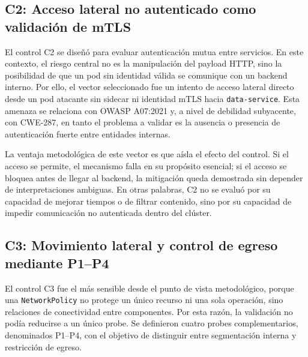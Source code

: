 \subsection{C2: Acceso lateral no autenticado como validación de mTLS}

El control C2 se diseñó para evaluar autenticación mutua entre servicios. En este contexto, el riesgo central no es la manipulación del payload HTTP, sino la posibilidad de que un pod sin identidad válida se comunique con un backend interno. Por ello, el vector seleccionado fue un intento de acceso lateral directo desde un pod atacante sin sidecar ni identidad mTLS hacia \texttt{data-service}. Esta amenaza se relaciona con OWASP A07:2021 y, a nivel de debilidad subyacente, con CWE-287, en tanto el problema a validar es la ausencia o presencia de autenticación fuerte entre entidades internas.

La ventaja metodológica de este vector es que aísla el efecto del control. Si el acceso se permite, el mecanismo falla en su propósito esencial; si el acceso se bloquea antes de llegar al backend, la mitigación queda demostrada sin depender de interpretaciones ambiguas. En otras palabras, C2 no se evaluó por su capacidad de mejorar tiempos o de filtrar contenido, sino por su capacidad de impedir comunicación no autenticada dentro del clúster.

\subsection{C3: Movimiento lateral y control de egreso mediante P1--P4}

El control C3 fue el más sensible desde el punto de vista metodológico, porque una \texttt{NetworkPolicy} no protege un único recurso ni una sola operación, sino relaciones de conectividad entre componentes. Por esta razón, la validación no podía reducirse a un único probe. Se definieron cuatro probes complementarios, denominados P1--P4, con el objetivo de distinguir entre segmentación interna y restricción de egreso.

